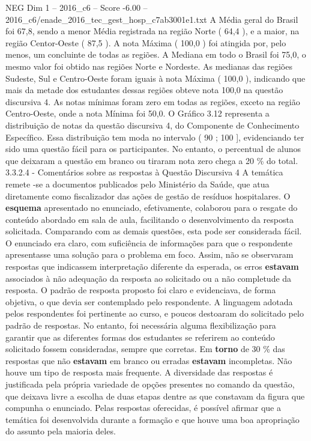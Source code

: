 \begin{textsample}{NEG Dim 1 – 2016\_c6 – Score -6.00 – 2016\_c6/enade\_2016\_tec\_gest\_hosp\_c7ab3001e1.txt}
A Média geral do Brasil foi 67,8, sendo a menor Média registrada na região Norte ( 64,4 ), e a maior, na região Centor-Oeste ( 87,5 ).
A nota Máxima ( 100,0 ) foi atingida por, pelo menos, um concluinte de todas as regiões.
A Mediana em todo o Brasil foi 75,0, o mesmo valor foi obtido nas regiões Norte e Nordeste.
As medianas das regiões Sudeste, Sul e Centro-Oeste foram iguais à nota Máxima ( 100,0 ), indicando que mais da metade dos estudantes dessas regiões obteve nota 100,0 na questão discursiva 4.
As notas mínimas foram zero em todas as regiões, exceto na região Centro-Oeste, onde a nota Mínima foi 50,0.
O Gráfico 3.12 representa a distribuição de notas da questão discursiva 4, do Componente de Conhecimento Específico.
Essa distribuição tem moda no intervalo ( 90 ; 100 ], evidenciando ter sido uma questão fácil para os participantes.
No entanto, o percentual de alunos que deixaram a questão em branco ou tiraram nota zero chega a 20 \% do total. 3.3.2.4 - Comentários sobre as respostas à Questão Discursiva 4 A temática remete -se a documentos publicados pelo Ministério da Saúde, que atua diretamente como fiscalizador das ações de gestão de resíduos hospitalares.
O \textbf{esquema} apresentado no enunciado, efetivamente, colaborou para o resgate do conteúdo abordado em sala de aula, facilitando o desenvolvimento da resposta solicitada.
Comparando com as demais questões, esta pode ser considerada fácil.
O enunciado era claro, com suficiência de informações para que o respondente apresentasse uma solução para o problema em foco.
Assim, não se observaram respostas que indicassem interpretação diferente da esperada, os erros \textbf{estavam} associados à não adequação da resposta ao solicitado ou a não completude da resposta.
O padrão de resposta proposto foi claro e evidenciava, de forma objetiva, o que devia ser contemplado pelo respondente.
A linguagem adotada pelos respondentes foi pertinente ao curso, e poucos destoaram do solicitado pelo padrão de respostas.
No entanto, foi necessária alguma flexibilização para garantir que as diferentes formas dos estudantes se referirem ao conteúdo solicitado fossem consideradas, sempre que corretas.
Em \textbf{torno} de 30 \% das respostas que não \textbf{estavam} em branco ou erradas \textbf{estavam} incompletas.
Não houve um tipo de resposta mais frequente.
A diversidade das respostas é justificada pela própria variedade de opções presentes no comando da questão, que deixava livre a escolha de duas etapas dentre as que constavam da figura que compunha o enunciado.
Pelas respostas oferecidas, é possível afirmar que a temática foi desenvolvida durante a formação e que houve uma boa apropriação do assunto pela maioria deles.

\end{textsample}
